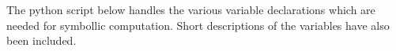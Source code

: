 The python script below handles the various variable declarations which are needed for symbollic computation. Short descriptions of the variables have also been included.
